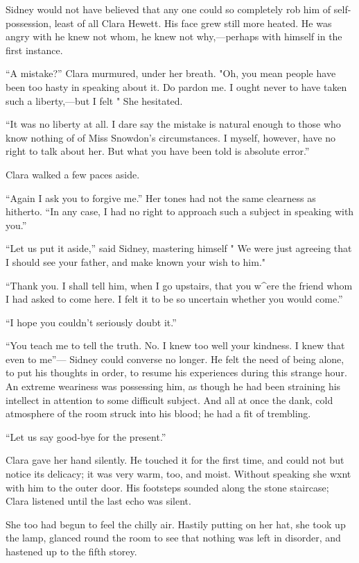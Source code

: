 Sidney would not have believed that any one could so completely rob him
of self-possession, least of all Clara Hewett. His face grew still more
heated. He was angry with he knew not whom, he knew not why,---perhaps
with himself in the first instance.

``A mistake?'' Clara murmured, under her breath. "Oh, you mean people
have been too hasty in speaking about it. Do pardon me.
{\protect\hypertarget{90}{}{}} I ought never to have taken such a
liberty,---but I felt " She hesitated.

``It was no liberty at all. I dare say the mistake is natural enough to
those who know nothing of of Miss Snowdon's circumstances. I myself,
however, have no right to talk about her. But what you have been told is
absolute error.''

Clara walked a few paces aside.

``Again I ask you to forgive me.'' Her tones had not the same clearness
as hitherto. ``In any case, I had no right to approach such a subject in
speaking with you.''

``Let us put it aside,'' said Sidney, mastering himself " We were just
agreeing that I should see your father, and make known your wish to
him."

``Thank you. I shall tell him, when I go upstairs, that you w\^{}ere the
friend whom I had asked to come here. I felt it to be so uncertain
whether you would come.''

``I hope you couldn't seriously doubt it.''

``You teach me to tell the truth. No. I knew too well your kindness. I
knew that even to me''--- {\protect\hypertarget{91}{}{}} Sidney could
converse no longer. He felt the need of being alone, to put his thoughts
in order, to resume his experiences during this strange hour. An extreme
weariness was possessing him, as though he had been straining his
intellect in attention to some difficult subject. And all at once the
dank, cold atmosphere of the room struck into his blood; he had a fit of
trembling.

``Let us say good-bye for the present.''

Clara gave her hand silently. He touched it for the first time, and
could not but notice its delicacy; it was very warm, too, and moist.
Without speaking she wxnt with him to the outer door. His footsteps
sounded along the stone staircase; Clara listened until the last echo
was silent.

She too had begun to feel the chilly air. Hastily putting on her hat,
she took up the lamp, glanced round the room to see that nothing was
left in disorder, and hastened up to the fifth storey.

